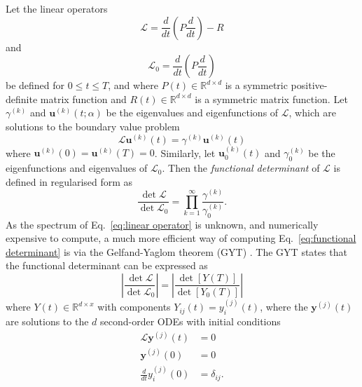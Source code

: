 \documentclass[withindex,glossary,techreport]{cam-thesis}
\begin{document}
\begin{appendices}
Let the linear operators
\begin{equation}
\mathcal{L}=\frac{d}{dt}\left(P\frac{d}{dt}\right)-R\label{eq:linear operator}
\end{equation}
and
\begin{equation}
\mathcal{L}_{0}=\frac{d}{dt}\left(P\frac{d}{dt}\right)\label{eq:free linear operator}
\end{equation}
be defined for $0\leq t\leq T$, and where $P(t)\in\mathbb{R}^{d\times d}$
is a symmetric positive-definite matrix function and $R(t)\in\mathbb{R}^{d\times d}$
is a symmetric matrix function. Let $\gamma^{(k)}$ and $\mathbf{u}^{(k)}(t;\alpha)$
be the eigenvalues and eigenfunctions of $\mathcal{L}$, which are
solutions to the boundary value problem
\begin{equation}
\mathcal{L}\mathbf{u}^{(k)}(t)=\gamma^{(k)}\mathbf{u}^{(k)}(t)\label{eq:eigenfunction eq}
\end{equation}
where $\mathbf{u}^{(k)}(0)=\mathbf{u}^{(k)}(T)=0$. Similarly, let
$\mathbf{u}_{0}^{(k)}(t)$ and $\gamma_{0}^{(k)}$ be the eigenfunctions
and eigenvalues of $\mathcal{L}_{0}$. Then the \emph{functional determinant}
of $\mathcal{L}$ is defined in regularised form as
\begin{equation}
\frac{\det\mathcal{L}}{\det\mathcal{L}_{0}}=\prod_{k=1}^{\infty}\frac{\gamma^{(k)}}{\gamma_{0}^{(k)}}.\label{eq:functional determinant}
\end{equation}
As the spectrum of Eq.~\ref{eq:linear operator} is unknown, and
numerically expensive to compute, a much more efficient way of computing
Eq.~\ref{eq:functional determinant} is via the Gelfand-Yaglom
theorem (GYT) \citep{gelfandIntegrationFunctionalSpaces1960,levitTheoremInfiniteProducts1977,dunneFunctionalDeterminantsQuantum2008}.
The GYT states that the functional determinant can be expressed as
\begin{equation}
\left|\frac{\det\mathcal{L}}{\det\mathcal{L}_{0}}\right|=\left|\frac{\det\left[Y(T)\right]}{\det\left[Y_{0}(T)\right]}\right|\label{eq:GY result}
\end{equation}
where $Y(t)\in\mathbb{R}^{d\times x}$ with components $Y_{ij}(t)=y_{i}^{(j)}(t)$,
where the $\mathbf{y}^{(j)}(t)$ are solutions to the $d$ second-order
ODEs with initial conditions
\begin{align} 
\mathcal{L}\mathbf{y}^{(j)}(t) & =0\label{eq:GY theorem}\\
\mathbf{y}^{(j)}(0) & =0\\
\frac{d}{dt}y_{i}^{(j)}(0) & =\delta_{ij}.
\end{align}

\end{appendices}
\end{document}
